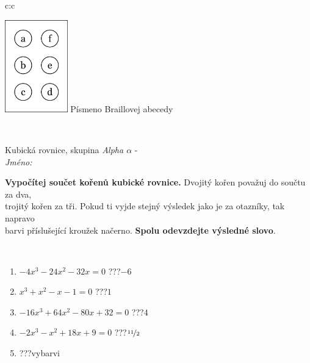 \documentclass[10pt]{report}
\begin{document}
\begin{tabular}{c:c}
\begin{minipage}[c][104.5mm][t]{0.5\linewidth}
\begin{center}
\begin{minipage}{0.20\linewidth}
\begin{center}
\includegraphics[height=40mm]{../images/braille.png}
{\small Písmeno Braillovej abecedy}
\end{center}
\end{minipage}
\end{center}
\end{minipage}
\\ \hdashline
\begin{minipage}[c][104.5mm][t]{0.5\linewidth}
\begin{center}
\vspace{7mm}
{\huge Kubická rovnice, skupina \textit{Alpha $\alpha$} -}\\[5mm]
\textit{Jméno:}\phantom{xxxxxxxxxxxxxxxxxxxxxxxxxxxxxxxxxxxxxxxxxxxxxxxxxxxxxxxxxxxxxxxxx}\\[5mm]
\begin{minipage}{0.95\linewidth}
\begin{center}
\textbf{Vypočítej součet kořenů kubické rovnice.} Dvojitý kořen považuj do součtu za dva,\\trojitý kořen za tři. Pokud ti vyjde stejný výsledek jako je za otazníky, tak napravo\\barvi příslušející kroužek načerno. \textbf{Spolu odevzdejte výsledné slovo}.
\end{center}
\end{minipage}
\\[1mm]
\begin{minipage}{0.79\linewidth}
\begin{center}
\begin{varwidth}{\linewidth}
\begin{enumerate}
\Large
\item $-4x^3-24x^2-32x=0$\quad \dotfill\; ???\;\dotfill \quad $-6$
\item $x^3+x^2-x-1=0$\quad \dotfill\; ???\;\dotfill \quad $1$
\item $-16x^3+64x^2-80x+32=0$\quad \dotfill\; ???\;\dotfill \quad $4$
\item $-2x^3-x^2+18x+9=0$\quad \dotfill\; ???\;\dotfill \quad $\nicefrac{11}{2}$
\item \quad \dotfill\; ???\;\dotfill \quad vybarvi

\end{enumerate}
\end{varwidth}
\end{center}
\end{minipage}
\end{center}
\end{minipage}
\end{tabular}
\end{document}
